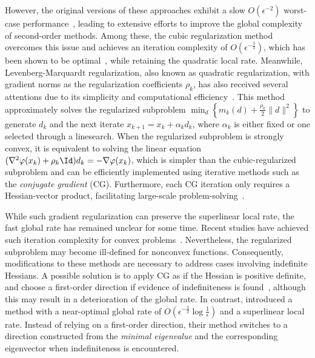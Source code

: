 However, the original versions of these approaches exhibit a slow 
$O(\epsilon^{-2})$ worst-case performance~\citep{conn2000trust,cartis2010complexity},
leading to extensive efforts to improve the global complexity of second-order methods.
Among these, 
the cubic regularization method~\citep{nesterov2006cubic} overcomes this issue and achieves an iteration complexity of $O(\epsilon^{-\frac{3}{2}})$, 
which has been shown to be optimal~\citep{carmon2020lower}, while retaining the quadratic local rate.
Meanwhile, Levenberg-Marquardt regularization, also known as quadratic regularization,
with gradient norms as the regularization coefficients $\rho_k$,
has also received several attentions due to its simplicity and computational efficiency~\citep{li2004regularized,polyak2009regularized}.
This method approximately solves the regularized subproblem 
$\min_{d} \left \{ m_k(d) + \frac{\rho_k}{2}\| d \|^2 \right \}$ to generate $d_k$ and the next iterate $x_{k+1} = x_k + \alpha_k d_k$, where $\alpha_k$ is either fixed or one selected through a linesearch.
When the regularized subproblem is strongly convex, it is equivalent to solving the linear equation %
$(\nabla^2 \varphi(x_k) + \rho_k \Id)d_k = -\nabla \varphi(x_k)$,
which is simpler than the cubic-regularized subproblem and can be efficiently implemented using %
iterative methods such as the \emph{conjugate gradient} (CG).
Furthermore, each CG iteration only requires a
Hessian-vector product, 
facilitating large-scale problem-solving~\citep{yang2015sdpnal+,li2018highly,li2018efficiently,sun2020sdpnal+,zhang2020efficient}.

While such gradient regularization can preserve the superlinear local rate,
the fast global rate has remained unclear for some time. 
Recent studies have achieved such iteration complexity for convex problems~\citep{mishchenko2023regularized,doikov2024gradient}.
Nevertheless, the regularized subproblem may become ill-defined for nonconvex functions.
Consequently, modifications to these methods are necessary to address cases involving indefinite Hessians.
A possible solution is to apply CG as if the Hessian is positive definite, and choose a first-order direction if evidence of indefiniteness is found~\citep{nocedal1999numerical}, 
although this may result in a deterioration of the global rate.
In contrast, 
\citet{gratton2024yet} introduced a method with a near-optimal global rate of $O(\epsilon^{-\frac{3}{2}}\log \frac{1}{\epsilon})$ and a superlinear local rate.
Instead of relying on a first-order direction, 
their method switches to a direction constructed from the \emph{minimal eigenvalue} and the corresponding eigenvector when indefiniteness is encountered.

